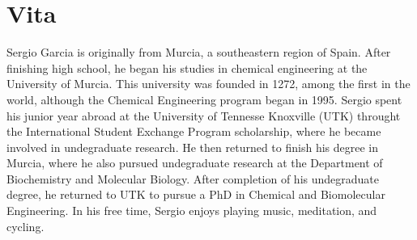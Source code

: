 \chapter*{Vita} \label{ch:vita}
Sergio Garcia is originally from Murcia, a southeastern region of Spain.
After finishing high school, he began his studies in chemical engineering at the University of Murcia. This university was founded in 1272, among the first in the world, although the Chemical Engineering program began in 1995.
Sergio spent his junior year abroad at the University of Tennesse Knoxville (UTK) throught the International Student Exchange Program scholarship, where he became involved in undegraduate research.
He then returned to finish his degree in Murcia, where he also pursued undegraduate research at the Department of Biochemistry and Molecular Biology.
After completion of his undegraduate degree, he returned to UTK to pursue a PhD in Chemical and Biomolecular Engineering.
In his free time, Sergio enjoys playing music, meditation, and cycling.
